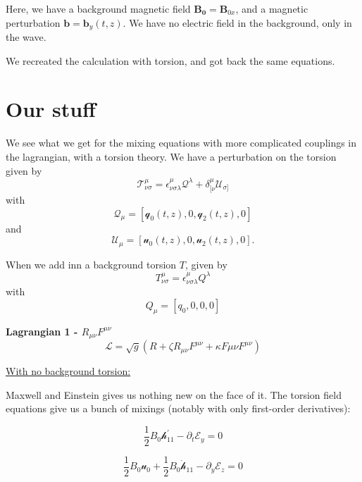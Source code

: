 \documentclass[letterpaper,12pt]{article}
\begin{document}
Here, we have a background magnetic field $\mathbf{B_0}=\mathbf{B}_{0x}$, and a magnetic perturbation $\mathbf{b}=\mathbf{b}_y (t,z)$. We have no electric field in the background, only in the wave.

We recreated the calculation with torsion, and got back the same equations.
\section{Our stuff}

We see what we get for the mixing equations with more complicated couplings in the lagrangian, with a torsion theory. We have a perturbation on the torsion given by 
\begin{equation}
\mathcal{T}^{\mu}_{\nu \sigma}=\epsilon^{\mu}_{\nu \sigma \lambda} \mathcal{Q}^{\lambda}+\delta^{\mu}_{[\nu} \mathcal{U}^{}_{\sigma]}
\end{equation}
with
\begin{equation}
\mathcal{Q}_{\mu}=[\mathcal{q}_0(t,z),0,\mathcal{q}_2(t,z),0]
\end{equation}
and
\begin{equation}
\mathcal{U}_{\mu}=[\mathcal{u}_0(t,z),0,\mathcal{u}_2(t,z),0].
\end{equation}

When we add inn a background torsion $T$, given by
\begin{equation}
T^{\mu}_{\nu \sigma}=\epsilon^{\mu}_{\nu \sigma \lambda}Q^{\lambda}
\end{equation}
with
\begin{equation}
Q_{\mu}=[q_0,0,0,0]
\end{equation}


\textbf{Lagrangian 1 - $R_{\mu \nu} F^{\mu \nu}$}
\begin{equation}
\mathcal{L}=\sqrt{g}(R+\zeta R_{\mu \nu} F^{\mu \nu}+\kappa F{\mu \nu}F^{\mu \nu})
\end{equation}

\underline{With no background torsion:}

Maxwell and Einstein gives us nothing new on the face of it. The torsion field equations give us a bunch of mixings (notably with only first-order derivatives):

\begin{equation}
\frac{1}{2}  B_0 \mathcal{h}_{11}^{'} -  \partial_{t}\mathcal{E}_y=0
\end{equation}

\begin{equation}
\frac{1}{2} B_0 \mathcal{u}_0 + \frac{1}{2} B_0 \dot{\mathcal{h}}_{11}-\partial_{y} \mathcal{E}_z=0
\end{equation}
\end{document}
